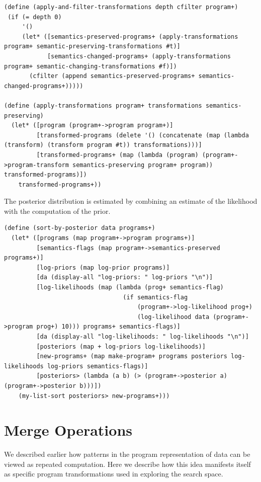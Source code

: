 \documentclass[a4paper,10pt]{article}
\begin{document}
\begin{lstlisting}[frame=trBL]
(define (apply-and-filter-transformations depth cfilter program+)
 (if (= depth 0)
     '()
     (let* ([semantics-preserved-programs+ (apply-transformations program+ semantic-preserving-transformations #t)]
            [semantics-changed-programs+ (apply-transformations program+ semantic-changing-transformations #f)])
       (cfilter (append semantics-preserved-programs+ semantics-changed-programs+)))))

(define (apply-transformations program+ transformations semantics-preserving)
  (let* ([program (program+->program program+)]
         [transformed-programs (delete '() (concatenate (map (lambda (transform) (transform program #t)) transformations)))]
         [transformed-programs+ (map (lambda (program) (program+->program-transform semantics-preserving program+ program)) transformed-programs)])
    transformed-programs+))
\end{lstlisting}
The posterior distribution is estimated by combining an estimate of the likelihood with the computation of the prior.  
\begin{lstlisting}[frame=trBL]
(define (sort-by-posterior data programs+)
  (let* ([programs (map program+->program programs+)]
         [semantics-flags (map program+->semantics-preserved programs+)]
         [log-priors (map log-prior programs)]
         [da (display-all "log-priors: " log-priors "\n")]
         [log-likelihoods (map (lambda (prog+ semantics-flag)
                                 (if semantics-flag
                                     (program+->log-likelihood prog+)
                                     (log-likelihood data (program+->program prog+) 10))) programs+ semantics-flags)]
         [da (display-all "log-likelihoods: " log-likelihoods "\n")]
         [posteriors (map + log-priors log-likelihoods)] 
         [new-programs+ (map make-program+ programs posteriors log-likelihoods log-priors semantics-flags)]
         [posteriors> (lambda (a b) (> (program+->posterior a) (program+->posterior b)))])
    (my-list-sort posteriors> new-programs+)))
\end{lstlisting}
\section{Merge Operations}
We described earlier how patterns in the program representation of data can be viewed as repeated computation.  Here we describe how this idea manifests itself as specific program transformations used in exploring the search space.
\end{document}
